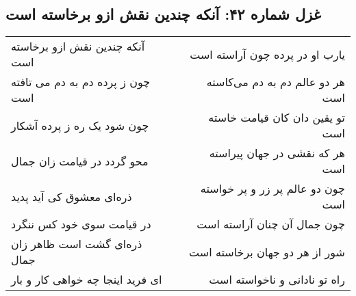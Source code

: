 \begin{center}
\section*{غزل شماره ۴۲: آنکه چندین نقش ازو برخاسته است}
\label{sec:042}
\begin{longtable}{l p{0.5cm} r}
آنکه چندین نقش ازو برخاسته است
&&
یارب او در پرده چون آراسته است
\\
چون ز پرده دم به دم می تافته است
&&
هر دو عالم دم به دم می‌کاسته است
\\
چون شود یک ره ز پرده آشکار
&&
تو یقین دان کان قیامت خاسته است
\\
محو گردد در قیامت زان جمال
&&
هر که نقشی در جهان پیراسته است
\\
ذره‌ای معشوق کی آید پدید
&&
چون دو عالم پر زر و پر خواسته است
\\
در قیامت سوی خود کس ننگرد
&&
چون جمال آن چنان آراسته است
\\
ذره‌ای گشت است ظاهر زان جمال
&&
شور از هر دو جهان برخاسته است
\\
ای فرید اینجا چه خواهی کار و بار
&&
راه تو نادانی و ناخواسته است
\\
\end{longtable}
\end{center}
